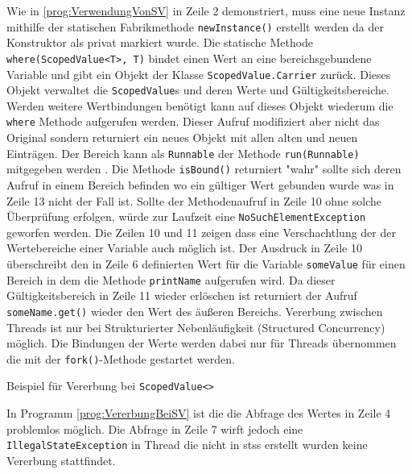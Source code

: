     Wie in \ref{prog:VerwendungVonSV} in Zeile 2 demonstriert, muss eine neue Instanz mithilfe der statischen Fabrikmethode \texttt{newInstance()} erstellt werden da der Konstruktor als privat 
    markiert wurde. 
    Die statische Methode \texttt{where(ScopedValue<T>, T)} bindet einen Wert an eine bereichsgebundene Variable und gibt ein Objekt der Klasse \texttt{ScopedValue.Carrier} zurück.
    Dieses Objekt verwaltet die \texttt{ScopedValue}s und deren Werte und Gültigkeitsbereiche. Werden weitere Wertbindungen benötigt kann auf dieses Objekt wiederum die \texttt{where} Methode 
    aufgerufen werden. Dieser Aufruf modifiziert aber nicht das Original sondern returniert ein neues Objekt mit allen alten und neuen Einträgen. Der Bereich kann als \texttt{Runnable}
    der Methode \texttt{run(Runnable)} mitgegeben werden \cite{oracle22Carrier}. 
    Die Methode \texttt{isBound()} returniert "wahr" sollte sich deren Aufruf in einem Bereich befinden wo ein gültiger Wert gebunden wurde was in Zeile 13 nicht der Fall ist.
    Sollte der Methodenaufruf in Zeile 10 ohne solche Überprüfung erfolgen, würde zur Laufzeit eine \texttt{NoSuchElementException} geworfen werden.
    Die Zeilen 10 und 11 zeigen dass eine Verschachtlung der der Wertebereiche einer Variable auch möglich ist. Der Ausdruck in Zeile 10 überschreibt den in Zeile 6 definierten Wert für die Variable
    \texttt{someValue} für einen Bereich in dem die Methode \texttt{printName} aufgerufen wird. Da dieser Gültigkeitsbereich in Zeile 11 wieder erlöschen ist returniert der Aufruf
    \texttt{someName.get()} wieder den Wert des äußeren Bereichs. Vererbung zwischen Threads ist nur bei Strukturierter Nebenläufigkeit (Structured Concurrency) möglich. Die Bindungen der Werte
    werden dabei nur für Threads übernommen die mit der \texttt{fork()}-Methode gestartet werden.
    \begin{program} [H]
        \caption{Beispiel für Vererbung bei \texttt{ScopedValue<>}}
        \label{prog:VererbungBeiSV}
    \begin{JavaCode}[language=Java, numbers=left]
private static final ScopedValue<String> NAME = ScopedValue.newInstance();
ScopedValue.runWhere(NAME, "duke", () -> {
    try (var scope = new StructuredTaskScope<String>()) {
        scope.fork(() -> {System.out.println(STR."Name: \{NAME.get()}");
        return null;});
    }
    Thread.ofVirtual().start(() -> {
        System.out.println(STR."Name: \{NAME.get()}");
    });    
});\end{JavaCode}
\end{program}
In Programm \ref{prog:VererbungBeiSV} ist die die Abfrage des Wertes in Zeile 4 problemlos möglich. Die Abfrage in Zeile 7 wirft
jedoch eine \texttt{IllegalStateException} in Thread die nicht in \Glspl{sts}
erstellt wurden keine Vererbung stattfindet.

